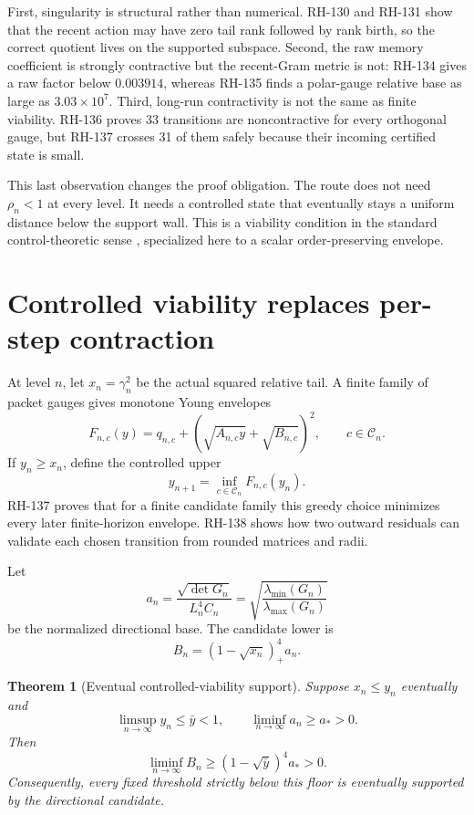 \documentclass[12pt]{article}
\newtheorem{theorem}{Theorem}
\begin{document}
First, singularity is structural rather than numerical.  RH-130 and RH-131
show that the recent action may have zero tail rank followed by rank birth,
so the correct quotient lives on the supported subspace.  Second, the raw
memory coefficient is strongly contractive but the recent-Gram metric is not:
RH-134 gives a raw factor below $0.003914$, whereas RH-135 finds a polar-gauge
relative base as large as $3.03\times10^7$.  Third, long-run contractivity is
not the same as finite viability.  RH-136 proves 33 transitions are
noncontractive for every orthogonal gauge, but RH-137 crosses 31 of them
safely because their incoming certified state is small.

This last observation changes the proof obligation.  The route does not need
$\rho_n<1$ at every level.  It needs a controlled state that eventually stays
a uniform distance below the support wall.  This is a viability condition in
the standard control-theoretic sense \citep{Aubin1991}, specialized here to a
scalar order-preserving envelope.

\section{Controlled viability replaces per-step contraction}
At level $n$, let $x_n=\gamma_n^2$ be the actual squared relative tail.  A
finite family of packet gauges gives monotone Young envelopes
\[
 F_{n,c}(y)=q_{n,c}+
 \left(\sqrt{A_{n,c}y}+\sqrt{B_{n,c}}\right)^2,
 \qquad c\in\mathcal C_n.
\]
If $y_n\geq x_n$, define the controlled upper
\begin{equation}\label{eq:control}
 y_{n+1}=\inf_{c\in\mathcal C_n}F_{n,c}(y_n).
\end{equation}
RH-137 proves that for a finite candidate family this greedy choice minimizes
every later finite-horizon envelope.  RH-138 shows how two outward residuals
can validate each chosen transition from rounded matrices and radii.

Let
\[
 a_n=\frac{\sqrt{\det G_n}}{L_n^4C_n}
 =\sqrt{\frac{\lambda_{\min}(G_n)}
 {\lambda_{\max}(G_n)}}
\]
be the normalized directional base.  The candidate lower is
\begin{equation}\label{eq:candidate}
 B_n=(1-\sqrt{x_n})_+^4a_n.
\end{equation}

\begin{theorem}[Eventual controlled-viability support]\label{thm:viability}
Suppose $x_n\leq y_n$ eventually and
\[
 \limsup_{n\to\infty}y_n\leq\bar y<1,
 \qquad
 \liminf_{n\to\infty}a_n\geq a_*>0.
\]
Then
\[
 \liminf_{n\to\infty}B_n
 \geq(1-\sqrt{\bar y})^4a_*>0.
\]
Consequently, every fixed threshold strictly below this floor is eventually
supported by the directional candidate.
\end{theorem}
\end{document}
